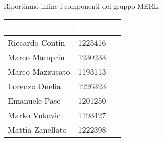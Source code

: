 Riportiamo infine i componenti del gruppo MERL:
\begin{center}
    \centering
    \begin{longtable}{|C{3,5cm}|C{2,5cm}|}
      \hline
      \textcolor[HTML]{FFFFFF}{\textbf{Nominativo}} & \textcolor[HTML]{FFFFFF}{\textbf{Matricola}} \\ \hline
      Riccardo Contin & 1225416 \\ \hline
      Marco Mamprin & 1230233 \\ \hline
      Marco Mazzucato & 1193113 \\ \hline
      Lorenzo Onelia & 1226323 \\ \hline
      Emanuele Pase & 1201250 \\ \hline
      Marko Vukovic & 1193427 \\ \hline
      Mattia Zanellato & 1222398 \\ \hline
    \end{longtable}
  \end{center}